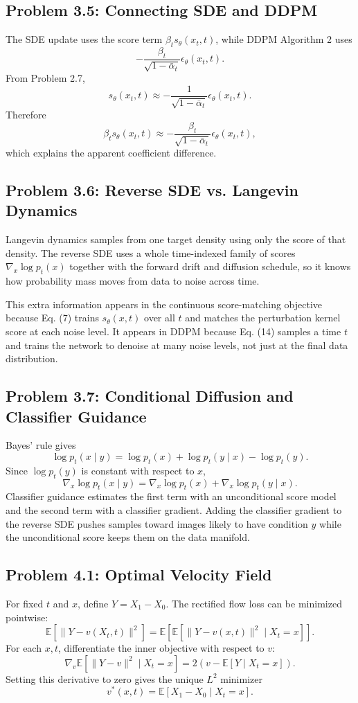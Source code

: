 \documentclass[11pt]{article}
\newcommand{\E}{\mathbb{E}}
\begin{document}
\subsection*{Problem 3.5: Connecting SDE and DDPM}
The SDE update uses the score term $\beta_t s_\theta(x_t,t)$, while DDPM Algorithm 2 uses
\[
-\frac{\beta_t}{\sqrt{1-\bar\alpha_t}}\epsilon_\theta(x_t,t).
\]
From Problem 2.7,
\[
s_\theta(x_t,t)\approx -\frac{1}{\sqrt{1-\bar\alpha_t}}\epsilon_\theta(x_t,t).
\]
Therefore
\[
\beta_t s_\theta(x_t,t)
\approx
-\frac{\beta_t}{\sqrt{1-\bar\alpha_t}}\epsilon_\theta(x_t,t),
\]
which explains the apparent coefficient difference.

\subsection*{Problem 3.6: Reverse SDE vs. Langevin Dynamics}
Langevin dynamics samples from one target density using only the score of that density.  The reverse SDE uses a whole time-indexed family of scores $\nabla_x\log p_t(x)$ together with the forward drift and diffusion schedule, so it knows how probability mass moves from data to noise across time.

This extra information appears in the continuous score-matching objective because Eq. (7) trains $s_\theta(x,t)$ over all $t$ and matches the perturbation kernel score at each noise level.  It appears in DDPM because Eq. (14) samples a time $t$ and trains the network to denoise at many noise levels, not just at the final data distribution.

\subsection*{Problem 3.7: Conditional Diffusion and Classifier Guidance}
Bayes' rule gives
\[
\log p_t(x\mid y)=\log p_t(x)+\log p_t(y\mid x)-\log p_t(y).
\]
Since $\log p_t(y)$ is constant with respect to $x$,
\[
\nabla_x\log p_t(x\mid y)
=\nabla_x\log p_t(x)+\nabla_x\log p_t(y\mid x).
\]
Classifier guidance estimates the first term with an unconditional score model and the second term with a classifier gradient.  Adding the classifier gradient to the reverse SDE pushes samples toward images likely to have condition $y$ while the unconditional score keeps them on the data manifold.

\subsection*{Problem 4.1: Optimal Velocity Field}
For fixed $t$ and $x$, define $Y=X_1-X_0$.  The rectified flow loss can be minimized pointwise:
\[
\E[\|Y-v(X_t,t)\|^2]
=\E\left[\E[\|Y-v(x,t)\|^2\mid X_t=x]\right].
\]
For each $x,t$, differentiate the inner objective with respect to $v$:
\[
\nabla_v \E[\|Y-v\|^2\mid X_t=x]
=2\left(v-\E[Y\mid X_t=x]\right).
\]
Setting this derivative to zero gives the unique $L^2$ minimizer
\[
v^*(x,t)=\E[X_1-X_0\mid X_t=x].
\]
\end{document}
